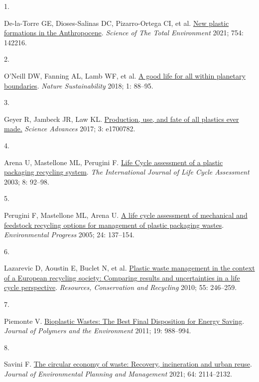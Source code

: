 \documentclass[
  11pt,
  a4paperpaper,
  onecolumn]{article}
\newlength{\cslhangindent}
\newlength{\csllabelwidth}
\newlength{\cslentryspacingunit} %
\newenvironment{CSLReferences}[2] %
 {%
  \setlength{\parindent}{0pt}
  \ifodd #1
  \let\oldpar\par
  \def\par{\hangindent=\cslhangindent\oldpar}
  \fi
  \setlength{\parskip}{#2\cslentryspacingunit}
 }%
 {}
\newcommand{\CSLLeftMargin}[1]{\parbox[t]{\csllabelwidth}{#1}}
\newcommand{\CSLRightInline}[1]{\parbox[t]{\linewidth - \csllabelwidth}{#1}\break}
\begin{document}
\hypertarget{refs}{}
\begin{CSLReferences}{0}{0}
\leavevmode{}%
\CSLLeftMargin{1. }%
\CSLRightInline{De-la-Torre GE, Dioses-Salinas DC, Pizarro-Ortega CI, et
al. \href{https://doi.org/10.1016/j.scitotenv.2020.142216}{New plastic
formations in the {Anthropocene}}. \emph{Science of The Total
Environment} 2021; 754: 142216.}

\leavevmode{}%
\CSLLeftMargin{2. }%
\CSLRightInline{O'Neill DW, Fanning AL, Lamb WF, et al.
\href{https://doi.org/10.1038/s41893-018-0021-4}{A good life for all
within planetary boundaries}. \emph{Nature Sustainability} 2018; 1:
88--95.}

\leavevmode{}%
\CSLLeftMargin{3. }%
\CSLRightInline{Geyer R, Jambeck JR, Law KL.
\href{https://doi.org/10.1126/sciadv.1700782}{Production, use, and fate
of all plastics ever made.} \emph{Science Advances} 2017; 3: e1700782.}

\leavevmode{}%
\CSLLeftMargin{4. }%
\CSLRightInline{Arena U, Mastellone ML, Perugini F.
\href{https://doi.org/10.1007/BF02978432}{Life {Cycle} assessment of a
plastic packaging recycling system}. \emph{The International Journal of
Life Cycle Assessment} 2003; 8: 92--98.}

\leavevmode{}%
\CSLLeftMargin{5. }%
\CSLRightInline{Perugini F, Mastellone ML, Arena U.
\href{https://doi.org/10.1002/ep.10078}{A life cycle assessment of
mechanical and feedstock recycling options for management of plastic
packaging wastes}. \emph{Environmental Progress} 2005; 24: 137--154.}

\leavevmode{}%
\CSLLeftMargin{6. }%
\CSLRightInline{Lazarevic D, Aoustin E, Buclet N, et al.
\href{https://doi.org/10.1016/j.resconrec.2010.09.014}{Plastic waste
management in the context of a {European} recycling society: {Comparing}
results and uncertainties in a life cycle perspective}. \emph{Resources,
Conservation and Recycling} 2010; 55: 246--259.}

\leavevmode{}%
\CSLLeftMargin{7. }%
\CSLRightInline{Piemonte V.
\href{https://doi.org/10.1007/s10924-011-0343-z}{Bioplastic {Wastes}:
{The Best Final Disposition} for {Energy Saving}}. \emph{Journal of
Polymers and the Environment} 2011; 19: 988--994.}

\leavevmode{}%
\CSLLeftMargin{8. }%
\CSLRightInline{Savini F.
\href{https://doi.org/10.1080/09640568.2020.1857226}{The circular
economy of waste: Recovery, incineration and urban reuse}. \emph{Journal
of Environmental Planning and Management} 2021; 64: 2114--2132.}


\end{CSLReferences}
\end{document}
